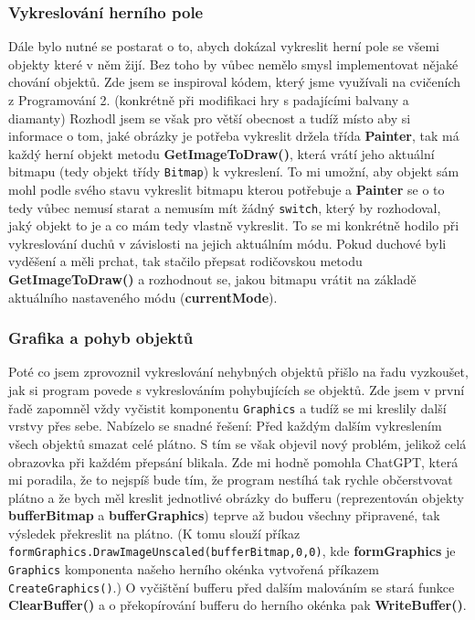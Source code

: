 \documentclass[a4]{article}
\begin{document}
\subsubsection{Vykreslování herního pole}
Dále bylo nutné se postarat o to, abych dokázal vykreslit herní pole se všemi objekty které v něm žijí. Bez toho by vůbec nemělo smysl implementovat nějaké chování objektů. Zde jsem se inspiroval kódem, který jsme využívali na cvičeních z Programování 2. (konkrétně při modifikaci hry s padajícími balvany a diamanty) Rozhodl jsem se však pro větší obecnost a tudíž místo aby si informace o tom, jaké obrázky je potřeba vykreslit držela třída \textbf{Painter}, tak má každý herní objekt metodu \textbf{GetImageToDraw()}, která vrátí jeho aktuální bitmapu (tedy objekt třídy \verb|Bitmap|) k vykreslení. To mi umožní, aby objekt sám mohl podle svého stavu vykreslit bitmapu kterou potřebuje a \textbf{Painter} se o to tedy vůbec nemusí starat a nemusím mít žádný \verb|switch|, který by rozhodoval, jaký objekt to je a co mám tedy vlastně vykreslit. To se mi konkrétně hodilo při vykreslování duchů v závislosti na jejich aktuálním módu. Pokud duchové byli vyděšení a měli prchat, tak stačilo přepsat rodičovskou metodu \textbf{GetImageToDraw()} a rozhodnout se, jakou bitmapu vrátit na základě aktuálního nastaveného módu (\textbf{currentMode}).
\subsubsection{Grafika a pohyb objektů}
Poté co jsem zprovoznil vykreslování nehybných objektů přišlo na řadu vyzkoušet, jak si program povede s vykreslováním pohybujících se objektů. Zde jsem v první řadě zapomněl vždy vyčistit komponentu \verb|Graphics| a tudíž se mi kreslily další vrstvy přes sebe. Nabízelo se snadné řešení: Před každým dalším vykreslením všech objektů smazat celé plátno. S tím se však objevil nový problém, jelikož celá obrazovka při každém přepsání blikala. Zde mi hodně pomohla ChatGPT, která mi poradila, že to nejspíš bude tím, že program nestíhá tak rychle občerstvovat plátno a že bych měl kreslit jednotlivé obrázky do bufferu (reprezentován objekty \textbf{bufferBitmap} a \textbf{bufferGraphics}) teprve až budou všechny připravené, tak výsledek překreslit na plátno. (K tomu slouží příkaz \verb|formGraphics.DrawImageUnscaled(bufferBitmap,0,0)|, kde \textbf{formGraphics} je \verb|Graphics| komponenta našeho herního okénka vytvořená příkazem \verb|CreateGraphics()|.) O vyčištění bufferu před dalším malováním se stará funkce \textbf{ClearBuffer()} a o překopírování bufferu do herního okénka pak \textbf{WriteBuffer()}.
\end{document}
